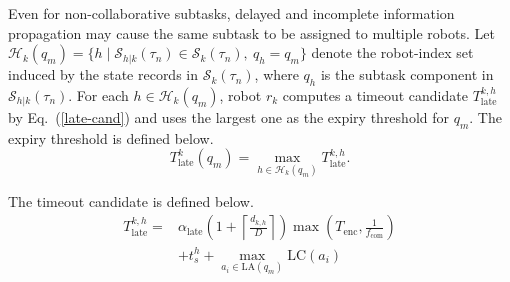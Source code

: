 \documentclass[lettersize,journal]{IEEEtran}
\begin{document}
Even for non-collaborative subtasks, delayed and incomplete information propagation may cause the same subtask to be assigned to multiple robots. Let $\mathcal{H}_k(q_m)=\{h\mid \mathcal{S}_{h|k}(\tau_n)\in \mathcal{S}_k(\tau_n),\ q_h=q_m\}$ denote the robot-index set induced by the state records in $\mathcal{S}_k(\tau_n)$, where $q_h$ is the subtask component in $\mathcal{S}_{h|k}(\tau_n)$. For each $h \in \mathcal{H}_k(q_m)$, robot $r_k$ computes a timeout candidate $T_{\mathrm{late}}^{k,h}$ by Eq.~(\ref{late-cand}) and uses the largest one as the expiry threshold for $q_m$. The expiry threshold is defined below.
\begin{equation} \label{late}
    T_{\mathrm{late}}^k(q_m) = \max_{h\in \mathcal{H}_k(q_m)} T_{\mathrm{late}}^{k,h}.
\end{equation}

The timeout candidate is defined below.
\begin{equation} \label{late-cand}
\begin{aligned}
T_{\mathrm{late}}^{k,h} ={}& \alpha_{\mathrm{late}}\left(1 + \left\lceil \frac{d_{k,h}}{D} \right\rceil\right)
\max\left(T_{\mathrm{enc}}, \frac{1}{f_{\mathrm{com}}}\right) \\
& + t_s^h + \max_{a_i \in \mathrm{LA}(q_m)}\mathrm{LC}(a_i)
\end{aligned}
\end{equation}
\end{document}
